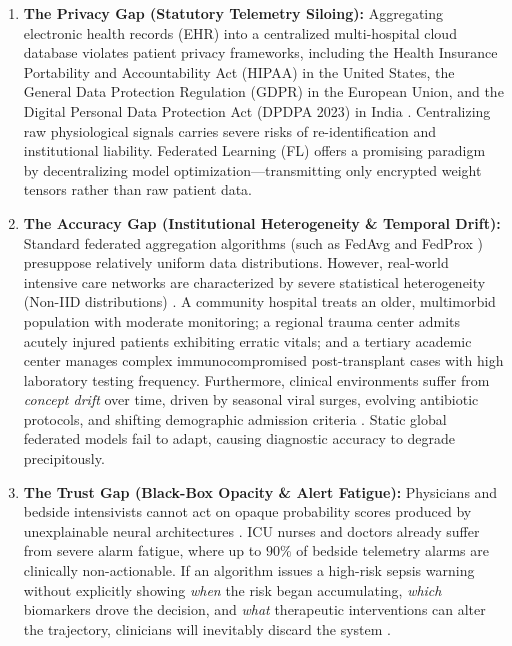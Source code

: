 \documentclass[journal,twocolumn,10pt]{IEEEtran}
\begin{document}
\begin{enumerate}
    \item \textbf{The Privacy Gap (Statutory Telemetry Siloing):} Aggregating electronic health records (EHR) into a centralized multi-hospital cloud database violates patient privacy frameworks, including the Health Insurance Portability and Accountability Act (HIPAA) in the United States, the General Data Protection Regulation (GDPR) in the European Union, and the Digital Personal Data Protection Act (DPDPA 2023) in India \cite{rieke2020future,kaissis2020trustworthy}. Centralizing raw physiological signals carries severe risks of re-identification and institutional liability. Federated Learning (FL) \cite{mcmahan2017,dayan2021exam} offers a promising paradigm by decentralizing model optimization---transmitting only encrypted weight tensors rather than raw patient data.
    
    \item \textbf{The Accuracy Gap (Institutional Heterogeneity \& Temporal Drift):} Standard federated aggregation algorithms (such as FedAvg \cite{mcmahan2017} and FedProx \cite{li2020fedprox}) presuppose relatively uniform data distributions. However, real-world intensive care networks are characterized by severe statistical heterogeneity (Non-IID distributions) \cite{yuan2024trend,wang2025personalized}. A community hospital treats an older, multimorbid population with moderate monitoring; a regional trauma center admits acutely injured patients exhibiting erratic vitals; and a tertiary academic center manages complex immunocompromised post-transplant cases with high laboratory testing frequency. Furthermore, clinical environments suffer from \textit{concept drift} over time, driven by seasonal viral surges, evolving antibiotic protocols, and shifting demographic admission criteria \cite{jothimurugesan2022,bernardi2023adaptive}. Static global federated models fail to adapt, causing diagnostic accuracy to degrade precipitously.
    
    \item \textbf{The Trust Gap (Black-Box Opacity \& Alert Fatigue):} Physicians and bedside intensivists cannot act on opaque probability scores produced by unexplainable neural architectures \cite{lundberg2018explainable,sundararajan2017axiomatic}. ICU nurses and doctors already suffer from severe alarm fatigue, where up to $90\%$ of bedside telemetry alarms are clinically non-actionable. If an algorithm issues a high-risk sepsis warning without explicitly showing \textit{when} the risk began accumulating, \textit{which} biomarkers drove the decision, and \textit{what} therapeutic interventions can alter the trajectory, clinicians will inevitably discard the system \cite{choi2016retain,larocca2021attention}.
\end{enumerate}
\end{document}
